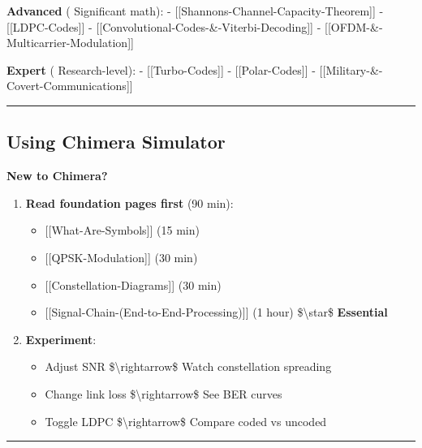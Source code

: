 \textbf{Advanced} ( Significant math): -
{[}{[}Shannon\textquotesingle s-Channel-Capacity-Theorem{]}{]} -
{[}{[}LDPC-Codes{]}{]} -
{[}{[}Convolutional-Codes-\&-Viterbi-Decoding{]}{]} -
{[}{[}OFDM-\&-Multicarrier-Modulation{]}{]}

\textbf{Expert} ( Research-level): - {[}{[}Turbo-Codes{]}{]} -
{[}{[}Polar-Codes{]}{]} - {[}{[}Military-\&-Covert-Communications{]}{]}

\begin{center}\rule{0.5\linewidth}{0.5pt}\end{center}

\subsection{\texorpdfstring{ Using Chimera
Simulator}{ Using Chimera Simulator}}\label{using-chimera-simulator}

\textbf{New to Chimera?}

\begin{enumerate}
\def\labelenumi{\arabic{enumi}.}
\tightlist
\item
  \textbf{Read foundation pages first} (90 min):

  \begin{itemize}
  \tightlist
  \item
    {[}{[}What-Are-Symbols{]}{]} (15 min)
  \item
    {[}{[}QPSK-Modulation{]}{]} (30 min)
  \item
    {[}{[}Constellation-Diagrams{]}{]} (30 min)
  \item
    {[}{[}Signal-Chain-(End-to-End-Processing){]}{]} (1 hour)
    \$\textbackslash star\$ \textbf{Essential}
  \end{itemize}
\item
  \textbf{Experiment}:

  \begin{itemize}
  \tightlist
  \item
    Adjust SNR \$\textbackslash rightarrow\$ Watch constellation
    spreading
  \item
    Change link loss \$\textbackslash rightarrow\$ See BER curves
  \item
    Toggle LDPC \$\textbackslash rightarrow\$ Compare coded vs uncoded
  \end{itemize}
\end{enumerate}

\begin{center}\rule{0.5\linewidth}{0.5pt}\end{center}

